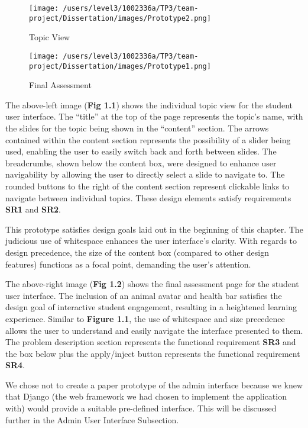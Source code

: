 \documentclass{l3proj}
\begin{document}
\begin{figure}[!htb]
\caption{Topic View}
\texttt{[image: /users/level3/1002336a/TP3/team-project/Dissertation/images/Prototype2.png]}
\end{figure}

\begin{figure}[!htb]  
\caption{Final Assessment}
 \texttt{[image: /users/level3/1002336a/TP3/team-project/Dissertation/images/Prototype1.png]}
\end{figure}

The above-left image (\textbf{Fig 1.1}) shows the individual topic view for the student user interface. The ``title'' at the top of the page represents the topic's name, with the slides for the topic being shown in the ``content'' section. The arrows contained within the content section represents the possibility of a slider being used, enabling the user to easily switch back and forth between slides. The breadcrumbs, shown below the content box, were designed to enhance user navigability by allowing the user to directly select a slide to navigate to. The rounded buttons to the right of the content section represent clickable links to navigate between individual topics. These design elements satisfy requirements \textbf{SR1} and \textbf{SR2}.

This prototype satisfies design goals laid out in the beginning of this chapter. The judicious use of whitespace enhances the user interface's clarity. With regards to design precedence, the size of the content box (compared to other design features) functions as a focal point, demanding the user's attention. 

The above-right image (\textbf{Fig 1.2}) shows the final assessment page for the student user interface. The inclusion of an animal avatar and health bar satisfies the design goal of interactive student engagement, resulting in a heightened learning experience. Similar to \textbf{Figure 1.1}, the use of whitespace and size precedence allows the user to understand and easily navigate the interface presented to them. The problem description section represents the functional requirement \textbf{SR3} and the box below plus the apply/inject button represents the functional requirement \textbf{SR4}.  

We chose not to create a paper prototype of the admin interface because we knew that Django (the web framework we had chosen to implement the application with) would provide a suitable pre-defined interface. This will be discussed further in the Admin User Interface Subsection. 
 
\end{document}
